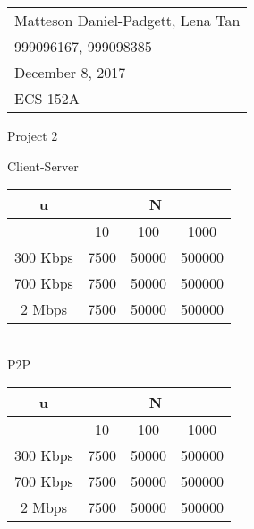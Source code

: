 \documentclass{article}
\begin{document}
	\null\hfill\begin{tabular}[t]{l@{}}
	Matteson Daniel-Padgett, Lena Tan\\
	999096167, 999098385\\
	December 8, 2017\\
	ECS 152A
\end{tabular}
	
\begin{center}	
\sc \Large Project 2
\end{center}	

\noindent Client-Server\\
\begin{tabular}{|c | c | c | c|}
	\hline
	u & \multicolumn{3}{|c|}{N} \\
	\hline
	 & 10 & 100 & 1000 \\
	\hline
	300 Kbps & 7500 & 50000 & 500000 \\
	\hline
	700 Kbps & 7500 & 50000 & 500000 \\
	\hline
	2 Mbps & 7500 & 50000 & 500000 \\
	\hline
\end{tabular} \\

\noindent P2P\\
\begin{tabular}{|c | c | c | c|}
	\hline
	u & \multicolumn{3}{|c|}{N} \\
	\hline
	& 10 & 100 & 1000 \\
	\hline
	300 Kbps & 7500 & 50000 & 500000 \\
	\hline
	700 Kbps & 7500 & 50000 & 500000 \\
	\hline
	2 Mbps & 7500 & 50000 & 500000 \\
	\hline
\end{tabular} \\

\part{}	
	
\section{}

\section{}

\section{}

\section{}

\part{}	
	
\section{}

\section{}
\end{document}
